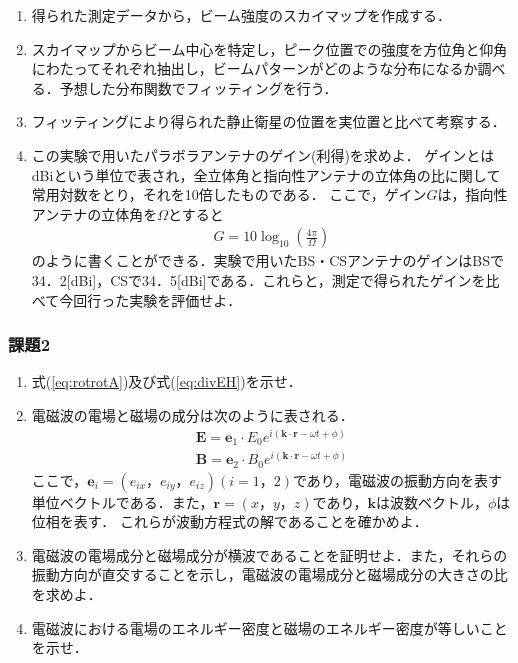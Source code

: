 \documentclass[a4j,10pt,oneside,openany]{jsbook}
\newcommand{\vE}{\boldsymbol{E}}
\newcommand{\vB}{\boldsymbol{B}}
\newcommand{\ve}{\boldsymbol{e}}
\newcommand{\vk}{\boldsymbol{k}}
\newcommand{\vr}{\boldsymbol{r}}
\begin{document}
{\begin{enumerate}[(1)]
  \item 得られた測定データから，ビーム強度のスカイマップを作成する．
  \item スカイマップからビーム中心を特定し，ピーク位置での強度を方位角と仰角にわたってそれぞれ抽出し，ビームパターンがどのような分布になるか調べる．予想した分布関数でフィッティングを行う．
  \item フィッティングにより得られた静止衛星の位置を実位置と比べて考察する．
  \item この実験で用いたパラボラアンテナのゲイン(利得)を求めよ．
  ゲインとはdBiという単位で表され，全立体角と指向性アンテナの立体角の比に関して常用対数をとり，それを10倍したものである．
  ここで，ゲイン$G$は，指向性アンテナの立体角を$\Omega$とすると
  \begin{align}
    G = 10\log_{10}\left({\frac{4\pi}{\Omega}}\right)
  \end{align}
  のように書くことができる．実験で用いたBS・CSアンテナのゲインはBSで34．2[dBi]，CSで34．5[dBi]である．これらと，測定で得られたゲインを比べて今回行った実験を評価せよ．

\end{enumerate}

\subsubsection{課題2}

\begin{enumerate}[(1)]
  \item 式(\ref{eq:rotrotA})及び式(\ref{eq:divEH})を示せ．
  \item 電磁波の電場と磁場の成分は次のように表される．
  \begin{align}
    \vE = \ve_1\cdot E_0 e^{i(\vk\cdot\vr-\omega t+\phi)}\nonumber\\
    \vB = \ve_2\cdot B_0 e^{i(\vk\cdot\vr-\omega t+\phi)}\nonumber
  \end{align}
  ここで，$\ve_i=(e_{ix}，e_{iy}，e_{iz})(i=1，2)$であり，電磁波の振動方向を表す単位ベクトルである．また，$\vr=(x，y，z)$であり，$\vk$は波数ベクトル，$\phi$は位相を表す．
  これらが波動方程式の解であることを確かめよ．
  \item 電磁波の電場成分と磁場成分が横波であることを証明せよ．また，それらの振動方向が直交することを示し，電磁波の電場成分と磁場成分の大きさの比を求めよ．
  \item 電磁波における電場のエネルギー密度と磁場のエネルギー密度が等しいことを示せ．
\end{enumerate}

}
\end{document}
